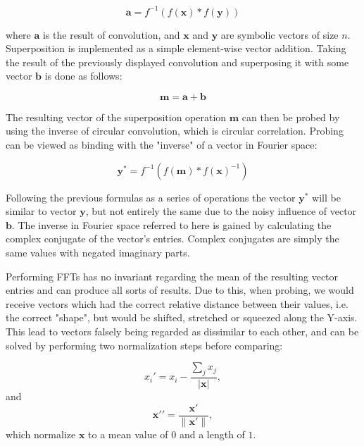 \documentclass[journal]{journal}
\begin{document}
	\begin{equation}
	\pmb a = f^{-1}(f(\pmb x) * f(\pmb y))
	\end{equation}
	
	where $\pmb a$ is the result of convolution, and $\pmb x$ and $\pmb y$ are symbolic vectors of size $n$.
Superposition is implemented as a simple element-wise vector addition. Taking the result of the previously displayed convolution and superposing it with some vector $\pmb b$ is done as follows:

	\begin{equation}
	\pmb m = \pmb a + \pmb b
	\end{equation}

The resulting vector of the superposition operation $\pmb m$ can then be probed
by using the inverse of circular convolution, which is circular correlation.
Probing can be viewed as binding with the "inverse" of a vector in Fourier space:
	
	\begin{equation}
	\pmb y^* = f^{-1}(f(\pmb m) * f(\pmb x)^{-1})
	\end{equation} 

Following the previous formulas as a series of operations the vector $\pmb y^*$ will be similar to vector $\pmb y$, but not entirely the same due to the noisy influence of vector $\pmb b$. The inverse in Fourier space referred to here is gained by calculating the complex conjugate of the vector's entries. Complex conjugates are simply the same values with negated imaginary parts.
		
	Performing FFTs has no invariant regarding the mean of the resulting vector entries and can produce all sorts of results.
Due to this, when probing, we would receive vectors which had the correct relative distance between their values, i.e.
the correct "shape", but would be shifted, stretched or squeezed along the Y-axis. This lead to vectors falsely being regarded as dissimilar to each other, and can be solved by performing two normalization steps before comparing:

	\begin{equation}\label{eq:norm1}
		{x_i}' = x_i - \frac{\sum_j x_j}{|{\pmb x}|},
	\end{equation}
and
	\begin{equation}\label{eq:norm2}
		{\pmb x}{'}{'} = \frac{{\pmb x}'}{ \| {\pmb x}'\|},
	\end{equation}
which normalize ${\pmb x}$ to a mean value of $0$ and a length of $1$.
	
\end{document}
